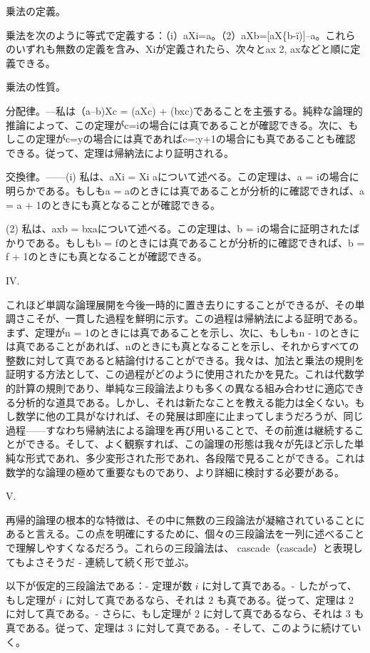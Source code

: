 \documentclass[a4paper,11pt,openany]{ltjsbook}
\begin{document}
乗法の定義。

乗法を次のように等式で定義する：（i）aXi=a。（2）aXb=[aX\{b-ï)]--a。これらのいずれも無数の定義を含み、Xiが定義されたら、次々とax 2, axなどと順に定義できる。

乗法の性質。

分配律。—私は（a--b)Xc = (aXc) + (bxc)であることを主張する。純粋な論理的推論によって、この定理がc=iの場合には真であることが確認できる。次に、もしこの定理がc=yの場合には真であればc=:y+1の場合にも真であることも確認できる。従って、定理は帰納法により証明される。

交換律。——(i) 私は、aXi = Xi aについて述べる。この定理は、a = iの場合に明らかである。もしもa = aのときには真であることが分析的に確認できれば、a = a + 1のときにも真となることが確認できる。

(2) 私は、axb = bxaについて述べる。この定理は、b = iの場合に証明されたばかりである。もしもb = fのときには真であることが分析的に確認できれば、b = f + 1のときにも真となることが確認できる。

IV.

これほど単調な論理展開を今後一時的に置き去りにすることができるが、その単調さこそが、一貫した過程を鮮明に示す。この過程は帰納法による証明である。まず、定理がn = 1のときには真であることを示し、次に、もしもn - 1のときには真であることがあれば、nのときにも真となることを示し、それからすべての整数に対して真であると結論付けることができる。我々は、加法と乗法の規則を証明する方法として、この過程がどのように使用されたかを見た。これは代数学的計算の規則であり、単純な三段論法よりも多くの異なる組み合わせに適応できる分析的な道具である。しかし、それは新たなことを教える能力は全くない。もし数学に他の工具がなければ、その発展は即座に止まってしまうだろうが、同じ過程——すなわち帰納法による論理を再び用いることで、その前進は継続することができる。そして、よく観察すれば、この論理の形態は我々が先ほど示した単純な形式であれ、多少変形された形であれ、各段階で見ることができる。これは数学的な論理の極めて重要なものであり、より詳細に検討する必要がある。

V.

再帰的論理の根本的な特徴は、その中に無数の三段論法が凝縮されていることにあると言える。この点を明確にするために、個々の三段論法を一列に述べることで理解しやすくなるだろう。これらの三段論法は、 cascade（cascade）と表現してもよさそうだ - 連続して続く形で並ぶ。

以下が仮定的三段論法である：- 定理が数 \( i \) に対して真である。- したがって、もし定理が \( i \) に対して真であるなら、それは \( 2 \) も真である。従って、定理は \( 2 \) に対して真である。- さらに、もし定理が \( 2 \) に対して真であるなら、それは \( 3 \) も真である。従って、定理は \( 3 \) に対して真である。- そして、このように続けていく。
\end{document}
